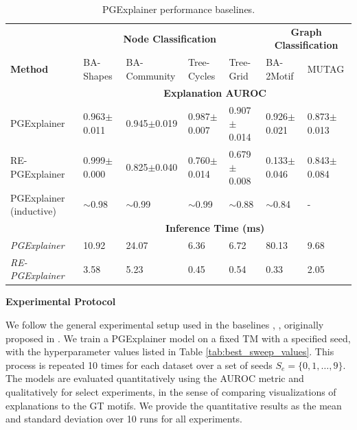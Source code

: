 \begin{table}[ht]
    \centering
    \scriptsize
    \begin{tabularx}{\textwidth}{lXXXX|XX}   %
    \textbf{} & \multicolumn{4}{c}{\textbf{Node Classification}} & \multicolumn{2}{c}{\textbf{Graph Classification}} \\
    \textbf{Method} & BA-Shapes & BA-Community & Tree-Cycles & Tree-Grid & BA-2Motif & MUTAG \\
    \midrule
    \addlinespace
    \textbf{} & \multicolumn{6}{c}{\textbf{Explanation AUROC}} \\
    \midrule
    PGExplainer & 0.963$\pm$0.011 & 0.945$\pm$0.019 & 0.987$\pm$0.007 & 0.907$\pm$0.014 & 0.926$\pm$0.021 & 0.873$\pm$0.013 \\
    \midrule
    RE-PGExplainer & 0.999$\pm$0.000 & 0.825$\pm$0.040 & 0.760$\pm$0.014 & 0.679$\pm$0.008 & 0.133$\pm$0.046 & 0.843$\pm$0.084 \\
    \midrule
    PGExplainer (inductive) & $\sim$0.98 & $\sim$0.99 & $\sim$0.99 & $\sim$0.88 & $\sim$0.84 & - \\
    \midrule
    \addlinespace
    \textbf{} & \multicolumn{6}{c}{\textbf{Inference Time (ms)}} \\
    \midrule
    \textit{PGExplainer} & 10.92 & 24.07 & 6.36 & 6.72 & 80.13 & 9.68 \\
    \textit{RE-PGExplainer} & 3.58 & 5.23 & 0.45 & 0.54 & 0.33 & 2.05 \\
    \bottomrule
    \end{tabularx}
    \caption[Baseline PGExplainer and RE-PGExplainer]{PGExplainer performance baselines.}
    \label{tab:pgexplainer_baseline}
\end{table}


\textbf{Experimental Protocol}\par
We follow the general experimental setup used in the baselines \cite{luo2020parameterized}, \cite{holdijk2021re}, originally proposed in \cite{ying2019gnnexplainer}. We train a PGExplainer model on a fixed \ac{TM} with a specified seed, with the hyperparameter values listed in Table \ref{tab:best_sweep_values}. This process is repeated 10 times for each dataset over a set of seeds $S_e=\{0,1,\dots,9\}$. The models are evaluated quantitatively using the AUROC metric and qualitatively for select experiments, in the sense of comparing visualizations of explanations to the \ac{GT} motifs. We provide the quantitative results as the mean and standard deviation over 10 runs for all experiments. \bigskip


